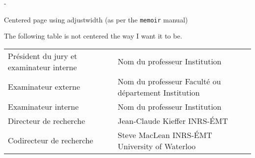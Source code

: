 \documentclass{memoir}
\begin{document}
    \newcommand{\jury}{%
    Président du jury et \newline examinateur interne &  Nom du professeur   \newline Institution                                  \\%
    Examinateur externe                               &  Nom du professeur   \newline Faculté ou département \newline Institution  \\%
    Examinateur interne                               &  Nom du professeur   \newline Institution                                  \\%
    Directeur de recherche                            &  Jean-Claude Kieffer \newline INRS-ÉMT                                     \\%
    Codirecteur de recherche                          &  Steve MacLean       \newline INRS-ÉMT \newline University of Waterloo
    }

    \thispagestyle{empty}
    \newlength{\centeradjust}
    \calccentering{\centeradjust}  %
    \begin{adjustwidth*}{\centeradjust}{-\centeradjust}   %
    \begin{adjustwidth}{-1cm}{-1cm}
      \begin{center}
      \begin{OnehalfSpace}
        \vspace*{3\baselineskip}
         {\Large Centered page using adjustwidth (as per the \texttt{memoir} manual)}

         \vfill

         The following table is not centered the way I want it to be.\\[1cm]
        \renewcommand{\arraystretch}{2}
         \begin{tabular}{p{5cm}@{}p{5cm}@{}}
          \jury
        \end{tabular}
       \vspace*{3\baselineskip}
     \end{OnehalfSpace}
     \end{center}
    \end{adjustwidth}
    \end{adjustwidth*}

    
\end{document}
